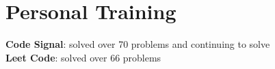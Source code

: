 \section{Personal Training}
    \begin{itemize}[leftmargin=0.15in, label={}]
	\small{\item{
		\textbf{Code Signal}{: solved over 70 problems and continuing to solve } \\
		\textbf{Leet Code}{: solved over 66 problems } \\
	}}
    \end{itemize}